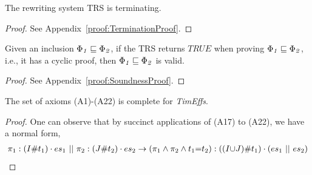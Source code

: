 \documentclass[acmsmall,10pt,review]{acmart}
\newcommand{\es}{\textcolor{black}{\ensuremath{{es}}}}
\newcommand{\timedEffects}{\emph{TimEffs}}
\newcommand{\effect}{\textcolor{black}{\ensuremath{\mathrm{\Phi}}}}
\newcommand{\code}[1]{{\tt{\ensuremath{\m{#1}}}}}
\newcommand{\CONTAIN}{\sqsubseteq}
\newcommand{\m}{\mathit}
\newcommand\appref[1]{Appendix~\textcolor{blue}{\ref{#1}}}
\begin{document}
{






 
\begin{theorem}[Termination]\label{termination}
The rewriting system TRS is terminating.
\end{theorem}
\begin{proof}
See %
\appref{proof:TerminationProof}.
\end{proof}

 \begin{theorem}[Soundness]\label{Cyclicsoundness}
Given an inclusion \code{\effect_1 \CONTAIN \effect_2}, if the TRS returns \code{TRUE} when proving \code{\effect_1 \CONTAIN \effect_2}, i.e., it has a cyclic proof, 
then \code{\effect_1 \CONTAIN \effect_2} is valid.
\end{theorem}


\begin{proof}
See %
\appref{proof:SoundnessProof}.
\end{proof}


%


 \begin{theorem}[Completeness]\label{Completeness}
 The set of axioms (A1)-(A22) is complete for \timedEffects.


\end{theorem}

\begin{proof} 
One can observe that by succinct applications of (A17) to (A22), we have a normal form, 
\begin{align}
\pi_1 : (I\# t_1) \cdot \es_1\ ||\ \pi_2 :  (J\# t_2) \cdot\es_2 \rightarrow  (\pi_1 \wedge \pi_2 \wedge t_1{=}t_2) :  ((I  {\cup} J) \# t_1) \cdot (\es_1\ ||\ \es_2)
\end{align}


\end{proof}}
\end{document}
